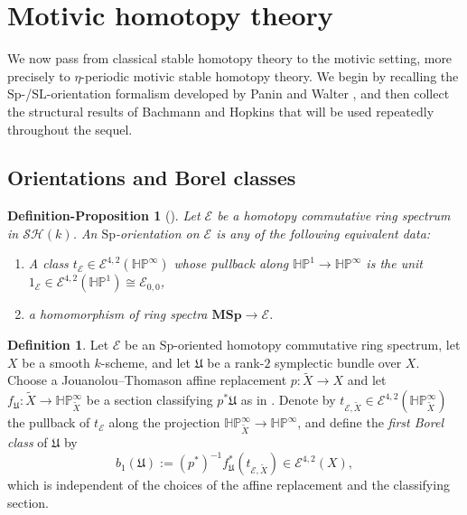 \documentclass[a4paper]{amsart}
\theoremstyle{plain}
\newtheorem{definition-proposition}[subsubsection]{Definition-Proposition}
\theoremstyle{definition}
\newtheorem{definition}[subsubsection]{Definition}
\newcommand{\Sp}{\mathrm{Sp}}
\newcommand{\SL}{\mathrm{SL}}
\newcommand{\MSp}{\mathbf{MSp}}
\newcommand{\E}{\mathcal{E}}
\newcommand{\HP}{\mathbb{HP}}
\newcommand{\HPinf}{\HP^{\infty}}
\newcommand{\SH}{\mathcal{SH}}
\begin{document}
\section{Motivic homotopy theory}\label{sec:motivic-homotopy-theory}
We now pass from classical stable homotopy theory to the motivic setting, more precisely to $\eta$-periodic motivic stable homotopy theory. We begin by recalling the $\Sp$-/$\SL$-orientation formalism developed by Panin and Walter \cite{panin2021quaternionic,panin2023on}, and then collect the structural results of Bachmann and Hopkins \cite{bachmann2021eta,bachmann2022eta} that will be used repeatedly throughout the sequel.

\subsection{Orientations and Borel classes}
\begin{definition-proposition}[{\cite{panin2023on}}]\label{def:sp-orientation}
Let $\E$ be a homotopy commutative ring spectrum in $\SH(k)$. An $\Sp$-orientation on $\E$ is any of the following equivalent data:
\begin{enumerate}
	\item A class $t_\E \in \E^{4,2}(\HPinf)$ whose pullback along $\HP^{1}\to\HPinf$ is the unit $1_{\E}\in \E^{4,2}(\HP^{1}) \cong \E_{0,0}$,
	\item a homomorphism of ring spectra $\MSp \to \E$.
\end{enumerate}
\end{definition-proposition}

\begin{definition}
	Let $\E$ be an $\Sp$-oriented homotopy commutative ring spectrum, let $X$ be a smooth $k$-scheme, and let $\mathfrak U$ be a rank-$2$ symplectic bundle over $X$. Choose a Jouanolou--Thomason affine replacement \cite[Proposition~4.4]{weibel1989homotopy} $p\colon\widetilde X\to X$ and let $f_{\mathfrak U}\colon\widetilde X\to\HPinf_{\widetilde X}$ be a section classifying $p^*\mathfrak U$ as in \cite[Equation~(11.2) and Theorem~11.2]{panin2023on}. Denote by $t_{\E,\widetilde X}\in\E^{4,2}(\HPinf_{\widetilde X})$ the pullback of $t_\E$ along the projection $\HPinf_{\widetilde X}\to\HPinf$, and define the \emph{first Borel class} of $\mathfrak U$ by
	\[
		b_1(\mathfrak U) := (p^*)^{-1}f_{\mathfrak U}^*(t_{\E,\widetilde X})
		\in\E^{4,2}(X),
	\]
	which is independent of the choices of the affine replacement and the classifying section.
\end{definition}
\end{document}
